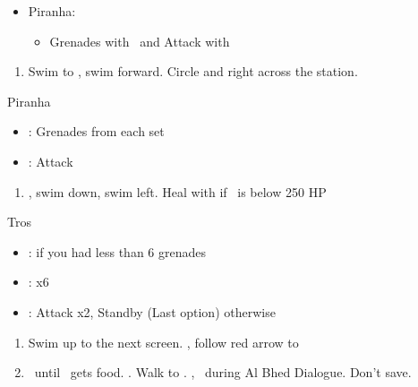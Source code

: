\begin{encounters}
	\begin{itemize}
		\item Piranha:
		      \begin{itemize}
			      \item \steal Grenades with \rikku \ and Attack with \tidus
		      \end{itemize}
	\end{itemize}
\end{encounters}
\begin{enumerate}[resume]
	\item Swim to \save, swim forward. Circle and right across the station.
\end{enumerate}
\begin{battle}{Piranha}
	\begin{itemize}
		\item \rikku: \steal Grenades from each set
		\item \tidus: Attack
	\end{itemize}
\end{battle}
\begin{enumerate}[resume]
	\item \cs, swim down, swim left. Heal with \potion if \rikku\ is  below 250 HP
\end{enumerate}
\begin{battle}[2200]{Tros}
	\begin{itemize}
		\item \rikku: \steal if you had less than 6 grenades
		\item \rikku: \grenade x6
		\item \tidus: Attack x2, Standby (Last option) otherwise
	\end{itemize}
\end{battle}
\begin{enumerate}[resume]
	\item Swim up to the next screen. \cs, follow red arrow to \cs[0:50]
	\item \sd\ until \tidus \ gets food. \cs[3:00]. Walk to \rikku. \cs[2:30], \sd\ during Al Bhed Dialogue. Don't save.
\end{enumerate}